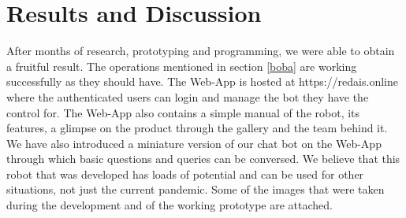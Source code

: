 \documentclass[AMA,STIX1COL]{WileyNJD-v2}
\begin{document}
\section{Results and Discussion}

After months of research, prototyping and programming, we were able to obtain a fruitful result. The operations mentioned in section \ref{boba} are working successfully as they should have. The Web-App is hosted at https://redais.online where the authenticated users can login and manage the bot they have the control for. The Web-App also contains a simple manual of the robot, its features, a glimpse on the product through the gallery and the team behind it. We have also introduced a miniature version of our chat bot on the Web-App through which basic questions and queries can be conversed. We believe that this robot that was developed has loads of potential and can be used for other situations, not just the current pandemic. Some of the images that were taken during the development and of the working prototype are attached. 

 


\end{document}
